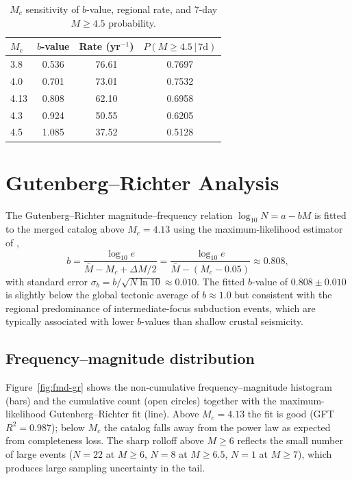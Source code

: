 \documentclass[10pt,a4paper,twocolumn]{article}
\begin{document}
\begin{table}[t]
\centering
\caption{$M_c$ sensitivity of $b$-value, regional rate, and 7-day $M\geq4.5$ probability.}\label{tab:mc-sensitivity}
\small
\begin{tabular*}{\columnwidth}{@{\extracolsep{\fill}}lccc}
\toprule
$M_c$ & $b$-value & Rate (yr$^{-1}$) & $P(M\geq4.5\,|\,7\text{d})$ \\
\midrule
3.8 & 0.536 & 76.61 & 0.7697 \\
4.0 & 0.701 & 73.01 & 0.7532 \\
4.13 & 0.808 & 62.10 & 0.6958 \\
4.3 & 0.924 & 50.55 & 0.6205 \\
4.5 & 1.085 & 37.52 & 0.5128 \\
\bottomrule
\end{tabular*}
\end{table}

\section{Gutenberg--Richter Analysis}\label{sec:gr}

The Gutenberg--Richter magnitude--frequency relation $\log_{10} N = a - bM$ \cite{gutenberg1944} is fitted to the merged catalog above $M_c=4.13$ using the maximum-likelihood estimator of \cite{aki1965},
\[
b = \frac{\log_{10} e}{\bar M - M_c + \Delta M / 2} = \frac{\log_{10} e}{\bar M - (M_c - 0.05)} \approx 0.808,
\]
with standard error $\sigma_b = b / \sqrt{N \ln 10} \approx 0.010$. The fitted $b$-value of $0.808\pm0.010$ is slightly below the global tectonic average of $b\approx1.0$ but consistent with the regional predominance of intermediate-focus subduction events, which are typically associated with lower $b$-values than shallow crustal seismicity.

\subsection{Frequency--magnitude distribution}

Figure~\ref{fig:fmd-gr} shows the non-cumulative frequency--magnitude histogram (bars) and the cumulative count (open circles) together with the maximum-likelihood Gutenberg--Richter fit (line). Above $M_c=4.13$ the fit is good (GFT $R^2=0.987$); below $M_c$ the catalog falls away from the power law as expected from completeness loss. The sharp rolloff above $M\geq6$ reflects the small number of large events ($N=22$ at $M\geq6$, $N=8$ at $M\geq6.5$, $N=1$ at $M\geq7$), which produces large sampling uncertainty in the tail.
\end{document}
